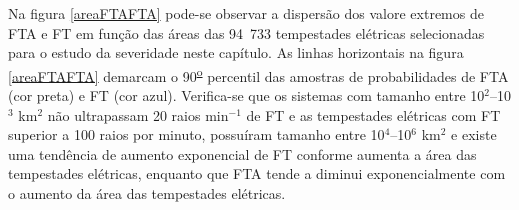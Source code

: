 



Na figura \ref{areaFTAFTA} pode-se observar a dispersão dos valore extremos de FTA e FT em função das áreas das 94~733 tempestades elétricas selecionadas  para o estudo da severidade neste capítulo. As linhas horizontais na figura \ref{areaFTAFTA} demarcam o 90\textsuperscript{\underline{o}} percentil das amostras de probabilidades de FTA (cor preta) e FT (cor azul). Verifica-se que os sistemas com tamanho entre 10$^2$--10$^3$ km$^2$ não ultrapassam 20 raios min$^{-1}$ de FT e as tempestades elétricas com FT superior a 100 raios por minuto, possuíram tamanho entre 10$^{4}$--10$^{6}$ km$^2$ e existe uma tendência de aumento exponencial de FT conforme aumenta a área das tempestades elétricas, enquanto que FTA tende a diminui exponencialmente com o aumento da área das tempestades elétricas.




